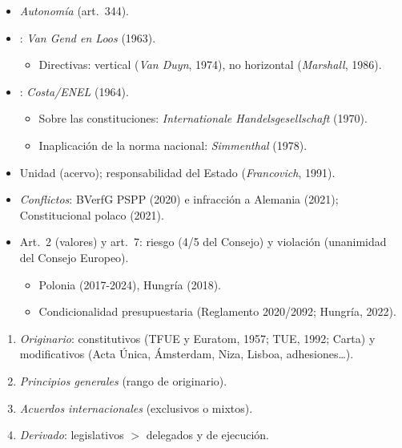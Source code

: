 \documentclass{article}
\begin{document}
\begin{columnas}
\begin{itemize}
\item \emph{Autonomía} (art.~344).
\item {}: \emph{Van Gend en Loos} (1963).
  \begin{itemize}
  \item Directivas: vertical (\emph{Van Duyn}, 1974), no horizontal (\emph{Marshall}, 1986).
  \end{itemize}
\item {}: \emph{Costa/ENEL} (1964).
  \begin{itemize}
  \item Sobre las constituciones: \emph{Internationale Handelsgesellschaft} (1970).
  \item Inaplicación de la norma nacional: \emph{Simmenthal} (1978).
  \end{itemize}
\item Unidad (acervo); responsabilidad del Estado (\emph{Francovich}, 1991).
\item \emph{Conflictos}: BVerfG PSPP (2020) e infracción a Alemania (2021); Constitucional polaco (2021).
\end{itemize}
\begin{itemize}
\item Art.~2 (valores) y art.~7: riesgo (4/5 del Consejo) y violación (unanimidad del Consejo Europeo).
  \begin{itemize}
  \item Polonia (2017-2024), Hungría (2018).
  \item Condicionalidad presupuestaria (Reglamento 2020/2092; Hungría, 2022).
  \end{itemize}
\end{itemize}
\begin{enumerate}
\item \emph{Originario}: constitutivos (TFUE y Euratom, 1957; TUE, 1992; Carta) y modificativos (Acta Única, Ámsterdam, Niza, Lisboa, adhesiones…).
\item \emph{Principios generales} (rango de originario).
\item \emph{Acuerdos internacionales} (exclusivos o mixtos).
\item \emph{Derivado}: legislativos $>$ delegados y de ejecución.
\end{enumerate}

\end{columnas}
\end{document}
